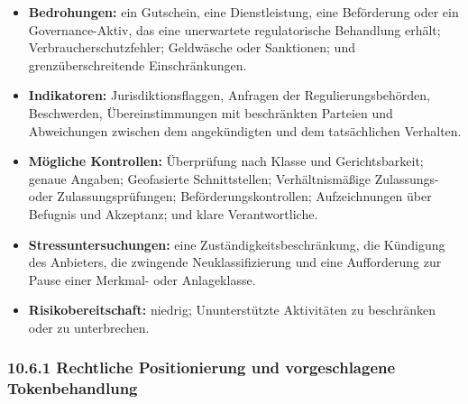 \documentclass[11pt]{article}
\begin{document}
\begin{itemize}[leftmargin=*]
\item \textbf{Bedrohungen:} ein Gutschein, eine Dienstleistung, eine Beförderung oder ein Governance-Aktiv, das eine unerwartete regulatorische Behandlung erhält; Verbraucherschutzfehler; Geldwäsche oder Sanktionen; und grenzüberschreitende Einschränkungen.
\item \textbf{Indikatoren:} Jurisdiktionsflaggen, Anfragen der Regulierungsbehörden, Beschwerden, Übereinstimmungen mit beschränkten Parteien und Abweichungen zwischen dem angekündigten und dem tatsächlichen Verhalten.
\item \textbf{Mögliche Kontrollen:} Überprüfung nach Klasse und Gerichtsbarkeit; genaue Angaben; Geofasierte Schnittstellen; Verhältnismäßige Zulassungs- oder Zulassungsprüfungen; Beförderungskontrollen; Aufzeichnungen über Befugnis und Akzeptanz; und klare Verantwortliche.
\item \textbf{Stressuntersuchungen:} eine Zuständigkeitsbeschränkung, die Kündigung des Anbieters, die zwingende Neuklassifizierung und eine Aufforderung zur Pause einer Merkmal- oder Anlageklasse.
\item \textbf{Risikobereitschaft:} niedrig; Ununterstützte Aktivitäten zu beschränken oder zu unterbrechen.
\end{itemize}
\subsubsection*{10.6.1 Rechtliche Positionierung und vorgeschlagene Tokenbehandlung}
\end{document}
